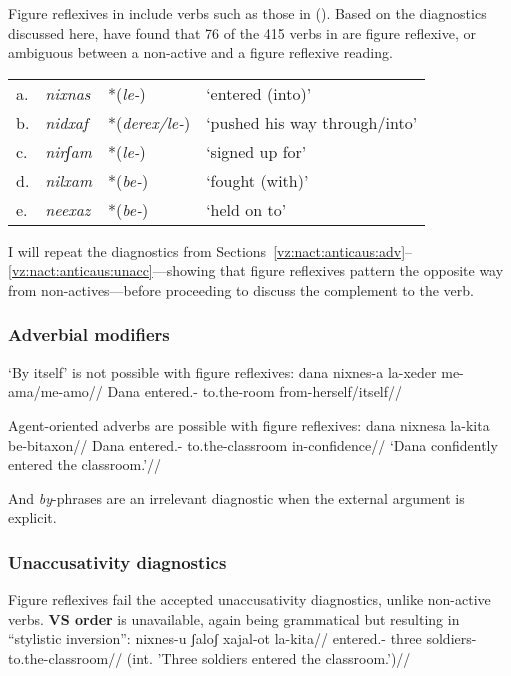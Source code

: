 {Figure reflexives in {\tnif} include verbs such as those in (\nextx). Based on the diagnostics discussed here, \cite{ahdoutkastner18} have found that 76 of the 415 verbs in {\tnif} are figure reflexive, or ambiguous between a non-active and a figure reflexive reading.   
\ex\label{ex:vz:figrefl} \begin{tabular}{l>{\em}lll}
	a.& nixnas &  *(\emph{le-}) & `entered (into)'\\
	b.& nidxaf & *(\emph{derex/le-})  & `pushed his way through/into' \\
	c.& nirʃam & *(\emph{le-})  & `signed up for' \\
	d.& nilxam & *(\emph{be-}) & `fought (with)' \\
	e.& neexaz & *(\emph{be-}) & `held on to' \\
    \end{tabular}
\xe

I will repeat the diagnostics from Sections~\ref{vz:nact:anticaus:adv}--\ref{vz:nact:anticaus:unacc}---showing that figure reflexives pattern the opposite way from non-actives---before proceeding to discuss the complement to the verb.

		\subsubsection{Adverbial modifiers} \label{vz:tnif:figrefl:adv}
`By itself' is not possible with figure reflexives:
\ex \begingl
	\gla\ljudge{*}dana nixnes-a la-xeder me-a{\ts}ma/me-a{\ts}mo//
	\glb Dana entered.- to.the-room from-herself/itself//
	\endgl
\xe

Agent-oriented adverbs are possible with figure reflexives:
\ex\label{ex:vz:nixnesa}\begingl
	\gla dana nixnesa la-kita be-bitaxon//
	\glb Dana entered.- to.the-classroom in-confidence//
	\glft `Dana confidently entered the classroom.'//
	\endgl
\xe

And \emph{by}-phrases are an irrelevant diagnostic when the external argument is explicit.

		\subsubsection{Unaccusativity diagnostics} \label{vz:tnif:figrefl:unacc}
Figure reflexives fail the accepted unaccusativity diagnostics, unlike non-active verbs. \textbf{VS order} is unavailable, again being grammatical but resulting in ``stylistic inversion'':
\ex \begingl
	\gla\ljudge{\#}nixnes-u ʃaloʃ xajal-ot la-kita//
	\glb entered.- three soldiers- to.the-classroom//
	\glft (int. 'Three soldiers entered the classroom.')//
	\endgl
\xe

}
